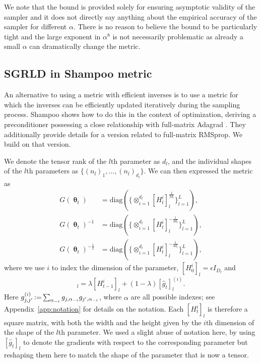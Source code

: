 \documentclass[10pt]{article} %
\DeclareMathOperator{\btheta}{\boldsymbol{\theta}}
\DeclareMathOperator{\defeq}{\vcentcolon=}
\theoremstyle{plain}
\theoremstyle{definition}
\theoremstyle{remark}
\begin{document}
We note that the bound is provided solely for ensuring asymptotic validity of the sampler and it does not directly say anything about the empirical accuracy of the sampler for different $\alpha$. There is no reason to believe the bound to be particularly tight and the large exponent in $\alpha^8$ is not necessarily problematic as already a small $\alpha$ can dramatically change the metric.

\subsection{SGRLD in Shampoo metric}


An alternative to using a metric with efficient inverses is to use a metric for which the inverses can be efficiently updated iteratively during the sampling process.
Shampoo \citep{Gupta2018,Anil2021} shows how to do this in the context of optimization, deriving a preconditioner possessing a close relationship with full-matrix Adagrad \citep{Duchi2011}. They additionally provide details for a version related to full-matrix RMSprop. We build on that version.

We denote the tensor rank of the $l$th parameter as $d_l$, and the individual shapes of the $l$th parameters as $\{ (n_{l})_{1},\dots ,(n_{l})_{d_{l}} \}$. We can then expressed the metric as
\begin{align*}
G(\btheta_t) &= \text{diag}(\{\otimes_{i=1}^{d_l} [H^{i}_{t}]_{l}^{\frac{1}{2d_l}}\}_{l=1}^{L}),\\
G(\btheta_t)^{-1} &= \text{diag}(\{\otimes_{i=1}^{d_l} [H^{i}_{t}]_{l}^{-\frac{1}{2d_l}}\}_{l=1}^{L}),\\
G(\btheta_t)^{-\frac{1}{2}} &= \text{diag}(\{\otimes_{i=1}^{d_l} [H^{i}_{t}]_{l}^{-\frac{1}{4d_l}}\}_{l=1}^{L}),
\end{align*}
where we use $i$ to index the dimension of the parameter, $[H_{0}^{i}]_{l} = \epsilon I_{D_l}$ and
\begin{equation*}
[H_{t}^{i}]_{l} = \lambda [H_{t-1}^{i}]_{l}+(1-\lambda)[\hat{g}_t]_{l}^{(i)}.
\end{equation*}
Here
$g^{(i)}_{j,j'} \defeq \sum_{\alpha_{-i}}g_{j,\alpha_{-i}}g_{j',\alpha_{-i}}$, where $\alpha$ are all possible indexes; see Appendix~\ref{app:notation} for details on the notation. Each $[H_{t}^{i}]_{l}$ is therefore a square matrix, with both the width and the height given by the $i$th dimension of the shape of the $l$th parameter. We used a slight abuse of notation here, by using $[\hat{g}_t]_l$ to denote the gradients with respect to the corresponding parameter but reshaping them here to match the shape of the parameter that is now a tensor.
\end{document}
